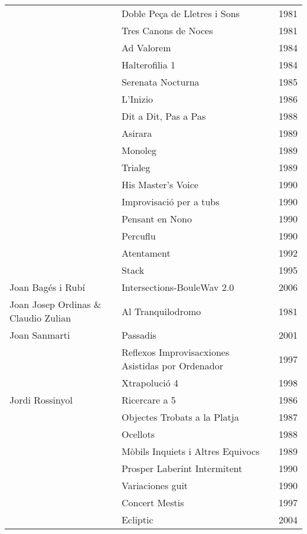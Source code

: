 \begin{center}
\begin{longtable}{ p{}  p{}  p{} }
& Doble Peça de Lletres i Sons & 1981 \\ \cmidrule (r){2-3} 
& Tres Canons de Noces & 1981 \\ \cmidrule (r){2-3} 
& Ad Valorem & 1984 \\ \cmidrule (r){2-3} 
& Halterofilia 1 & 1984 \\ \cmidrule (r){2-3} 
& Serenata Nocturna & 1985 \\ \cmidrule (r){2-3} 
& L'Inizio & 1986 \\ \cmidrule (r){2-3} 
& Dit a Dit, Pas a Pas & 1988 \\ \cmidrule (r){2-3} 
& Asirara & 1989 \\ \cmidrule (r){2-3} 
& Monoleg & 1989 \\ \cmidrule (r){2-3} 
& Trialeg & 1989 \\ \cmidrule (r){2-3} 
& His Master's Voice & 1990 \\ \cmidrule (r){2-3} 
& Improvisació per a tubs & 1990 \\ \cmidrule (r){2-3} 
& Pensant en Nono & 1990 \\ \cmidrule (r){2-3} 
& Percuflu & 1990 \\ \cmidrule (r){2-3} 
& Atentament & 1992 \\ \cmidrule (r){2-3} 
& Stack & 1995 \\ \midrule 
Joan Bagés i Rubí & Intersections-BouleWav 2.0 & 2006 \\ \midrule 
Joan Josep Ordinas \& Claudio Zulian & Al Tranquilodromo & 1981 \\ \midrule 
Joan Sanmarti & Passadis & 2001 \\ \cmidrule (r){2-3} 
& Reflexos Improvisacxiones Asistidas por Ordenador & 1997 \\ \cmidrule (r){2-3} 
& Xtrapolució 4 & 1998 \\ \midrule 
Jordi Rossinyol & Ricercare a 5 & 1986 \\ \cmidrule (r){2-3} 
& Objectes Trobats a la Platja & 1987 \\ \cmidrule (r){2-3} 
& Ocellots & 1988 \\ \cmidrule (r){2-3} 
& Mòbils Inquiets i Altres Equivocs & 1989 \\ \cmidrule (r){2-3} 
& Prosper Laberint Intermitent & 1990 \\ \cmidrule (r){2-3} 
& Variaciones guit & 1990 \\ \cmidrule (r){2-3} 
& Concert Mestis & 1997 \\ \cmidrule (r){2-3} 
& Ecliptic & 2004 \\ \midrule 

\end{longtable}
\end{center}
